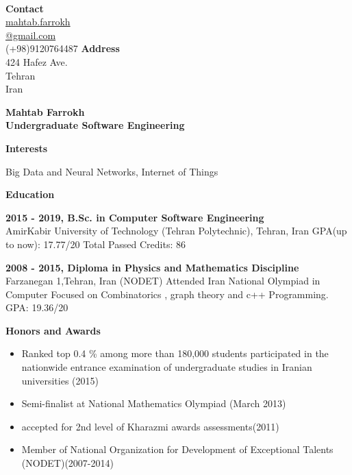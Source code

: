 \documentclass[a4paper,12pt,final]{memoir}
\newcommand{\Sep}{\vspace{1.5em}}
\newcommand{\SmallSep}{\vspace{0.5em}}
\newenvironment{AboutMe}
	{\ignorespaces\textbf{\color{RoyalBlue} About me}}
	{\Sep\ignorespacesafterend}
\newcommand{\CVSection}[1]
	{\Large\textbf{#1}\par
	\SmallSep\normalsize\normalfont}
\newcommand{\CVItem}[1]
	{\textbf{\color{RoyalBlue} #1}}
\begin{document}


\begin{flushright}\small

	
	 \CVItem{\\ Contact} \\
	 
	\href{mailto://mahtab.farrokh@gmail.com}{mahtab.farrokh\\ @gmail.com}  \\
	(+98)9120764487 
	\CVItem{Address} \\
	424 Hafez Ave. \\
	Tehran\\
	Iran
	
\end{flushright}\normalsize
\framebreak



\Huge\bfseries {\color{RoyalBlue} Mahtab Farrokh} \\
\Large\bfseries  Undergraduate Software Engineering \\

\normalsize\normalfont


\CVSection{Interests}
	Big Data and Neural Networks, Internet of Things
	
\Sep

\CVSection{Education}
\CVItem{2015 - 2019, B.Sc. in Computer Software Engineering}\\
AmirKabir University of Technology (Tehran Polytechnic), Tehran, Iran
GPA(up to now): 17.77/20
Total Passed Credits: 86
\SmallSep

\CVItem{2008 - 2015, Diploma in Physics and Mathematics Discipline}\\
Farzanegan 1,Tehran, Iran (NODET)
Attended Iran National Olympiad in Computer Focused on Combinatorics
, graph theory and c++ Programming.
GPA: 19.36/20
\Sep

\CVSection{Honors and Awards}
\begin{itemize}
	\item Ranked top 0.4 \% among more than 180,000 students participated
in the nationwide entrance examination of undergraduate studies
in Iranian universities (2015) 
	\item Semi-finalist at National Mathematics Olympiad (March 2013)
	\item accepted for 2nd level of Kharazmi awards assessments(2011)
	\item Member of National Organization for Development of Exceptional  Talents (NODET)(2007-2014)
 
\end{itemize}
\end{document}
